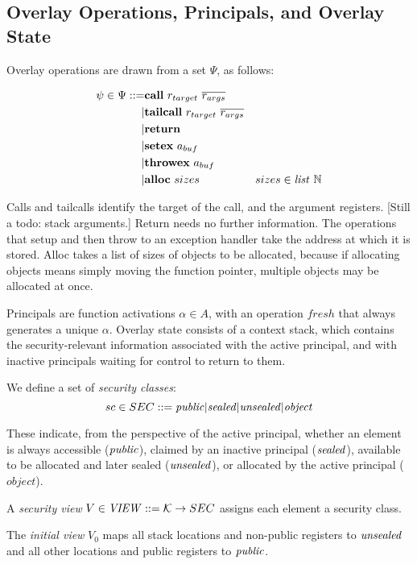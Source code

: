 \documentclass[10pt,conference]{ieeetran}%
\theoremstyle{definition}
\begin{document}
\subsection{Overlay Operations, Principals, and Overlay State}

Overlay operations are drawn from a set \(\Psi\), as follows:

\begin{align*}
\psi \in \Psi ::= & \mathbf{call} ~ r_{target} ~ \overline{r_{args}} & \\
| & \mathbf{tailcall} ~ r_{target} ~ \overline{r_{args}} & \\
| & \mathbf{return} & \\
| & \mathbf{setex} ~ a_{buf} \\
| & \mathbf{throwex} ~ a_{buf} \\
| & \mathbf{alloc} ~ sizes & sizes \in \mathit{list} ~ \mathbb{N} \\
\end{align*}

Calls and tailcalls identify the target of the call, and the argument registers.
[Still a todo: stack arguments.] Return needs no further information. The operations
that setup and then throw to an exception handler take the address at which it is
stored. Alloc takes a list of sizes of objects to be allocated, because if allocating
objects means simply moving the function pointer, multiple
objects may be allocated at once.

Principals are function activations \(\alpha \in A\), with an operation
\(\mathit{fresh}\) that always generates a unique \(\alpha\).
Overlay state consists of a context stack, which contains the security-relevant
information associated with the active principal, and with inactive principals
waiting for control to return to them.

We define a set of {\it security classes}:
\[sc \in SEC ::= \mathit{public} | \mathit{sealed} | \mathit{unsealed} | \mathit{object}\]

These indicate, from the perspective of the active principal, whether an element is
always accessible (\(\mathit{public}\)), claimed by an inactive principal (\(\mathit{sealed}\)),
available to be allocated and later sealed (\(\mathit{unsealed}\)), or allocated by
the active principal (\(\mathit{object}\)).

A {\it security view} \(V \in \mathit{VIEW} ::= {\mathcal K} \rightarrow SEC\)
assigns each element a security class.

The {\it initial view} \(V_0\) maps all stack locations and non-public registers
to \(\mathit{unsealed}\) and all other locations and public registers to \(\mathit{public}\).
\end{document}
